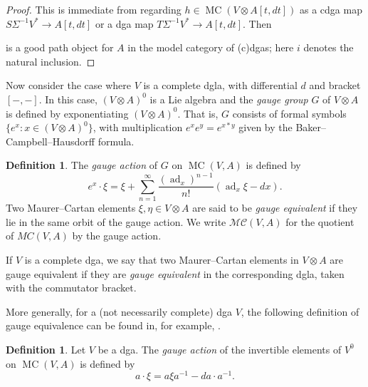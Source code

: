 \documentclass[a4paper,reqno]{amsart}
\theoremstyle{plain}
\theoremstyle{definition}
\newtheorem{defn}[thm]{Definition}
\theoremstyle{remark}
\DeclareMathOperator{\ad}{ad}
\DeclareMathOperator{\MC}{MC}
\begin{document}
\begin{proof}
  This is immediate from regarding $h \in \MC(V \otimes A[t,dt])$ as a cdga map $S\Sigma^{-1}V^* \to A[t,dt]$ or a dga map $T\Sigma^{-1}V^* \to A[t,dt]$. Then
  \begin{center}
  \end{center}
  is a good path object for $A$ in the model category of (c)dgas; here $i$ denotes the natural inclusion.
\end{proof}

Now consider the case where $V$ is a complete dgla, with differential $d$ and bracket $[-,-]$.
In this case, $(V \otimes A)^0$ is a Lie algebra and the \emph{gauge group} $G$ of $V \otimes A$ is defined by exponentiating $(V \otimes A)^0$. 
That is, $G$ consists of formal symbols $\{e^x : x \in (V \otimes A)^0\}$, with multiplication $e^x e^y = e^{x * y}$ given by the Baker--Campbell--Hausdorff formula.

\begin{defn}
  \label{def:gauge}
  The \emph{gauge action} of $G$ on $\MC(V,A)$ is defined by
  \begin{equation}
    \label{eq:gauge_dgla}
    e^x \cdot \xi =  \xi + \sum_{n=1}^{\infty} \frac{(\ad_x)^{n-1}}{n!} (\ad_x\xi - dx).
  \end{equation} 
  Two Maurer--Cartan elements $\xi, \eta \in V \otimes A$ are said to be \emph{gauge equivalent} if they lie in the same orbit of the gauge action. 
  We write $\mathscr{MC}(V,A)$ for the quotient of $MC(V,A)$ by the gauge action.

  If $V$ is a complete dga, we say that two Maurer--Cartan elements in $V \otimes A$ are gauge equivalent if they are \emph{gauge equivalent} in the corresponding dgla, taken with the commutator bracket.
\end{defn}

More generally, for a (not necessarily complete) dga $V$, the following definition of gauge equivalence can be found in, for example, \cite{chl}.

\begin{defn}
  Let $V$ be a dga. The \emph{gauge action} of the invertible elements of $V^0$ on $\MC(V,A)$ is defined by
  \begin{equation}
    \label{eq:gauge_dga}
    a \cdot \xi =  a \xi a^{-1} - da \cdot a^{-1}.
  \end{equation}
\end{defn}
\end{document}
